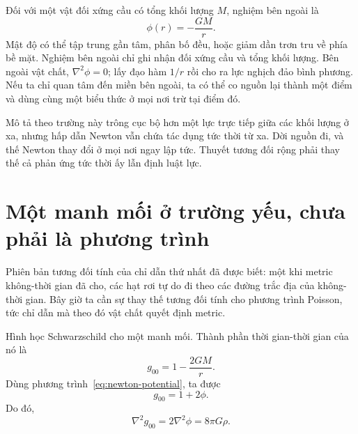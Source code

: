 Đối với một vật đối xứng cầu có tổng khối lượng \(M\), nghiệm bên ngoài là
\begin{equation}
 \phi(r)=-\frac{GM}{r}.
 \label{eq:newton-potential}
\end{equation}
Mật độ có thể tập trung gần tâm, phân bố đều, hoặc giảm dần trơn tru về phía bề mặt. Nghiệm bên ngoài chỉ ghi nhận đối xứng cầu và tổng khối lượng. Bên ngoài vật chất,
\(\nabla^2\phi=0\); lấy đạo hàm \(1/r\) rồi cho ra lực nghịch đảo bình phương. Nếu ta chỉ quan tâm đến miền bên ngoài, ta có thể co nguồn lại thành một điểm và dùng cùng một biểu thức ở mọi nơi trừ tại điểm đó.

\begin{classroomqa}
\end{classroomqa}

Mô tả theo trường này trông cục bộ hơn một lực trực tiếp giữa các khối lượng ở xa, nhưng hấp dẫn Newton vẫn chứa tác dụng tức thời từ xa. Dời nguồn đi, và thế Newton thay đổi ở mọi nơi ngay lập tức. Thuyết tương đối rộng phải thay thế cả phản ứng tức thời ấy lẫn định luật lực.

\section{Một manh mối ở trường yếu, chưa phải là phương trình}

Phiên bản tương đối tính của chỉ dẫn thứ nhất đã được biết: một khi metric không-thời gian đã cho, các hạt rơi tự do đi theo các đường trắc địa của không-thời gian. Bây giờ ta cần sự thay thế tương đối tính cho phương trình Poisson, tức chỉ dẫn mà theo đó vật chất quyết định metric.

Hình học Schwarzschild cho một manh mối. Thành phần thời gian-thời gian của nó là
\begin{equation}
 g_{00}=1-\frac{2GM}{r}.
\end{equation}
Dùng phương trình~\eqref{eq:newton-potential}, ta được
\begin{equation}
 g_{00}=1+2\phi.
\end{equation}
Do đó,
\begin{equation}
 \nabla^2g_{00}=2\nabla^2\phi=8\pi G\rho.
 \label{eq:weak-mnemonic}
\end{equation}


